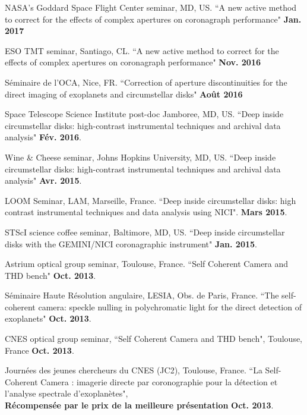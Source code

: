 \documentclass[11pt,a4paper, french]{article}
\begin{document}
\begin{etaremune}
\item NASA's Goddard Space Flight Center seminar, MD, US. ``A new active method to correct for the effects of complex apertures on coronagraph performance" \textbf{Jan. 2017}

\item ESO TMT seminar, Santiago, CL. ``A new active method to correct for the effects of complex apertures on coronagraph performance" \textbf{Nov. 2016}

\item Séminaire de l'OCA, Nice, FR. ``Correction of aperture discontinuities for the direct imaging of exoplanets and circumstellar disks" \textbf{Août 2016}

\item Space Telescope Science Institute post-doc Jamboree, MD, US. ``Deep inside circumstellar disks: high-contrast instrumental techniques and archival data analysis" \textbf{Fév. 2016}.

\item Wine \& Cheese seminar, Johns Hopkins University, MD, US. ``Deep inside circumstellar disks: high-contrast instrumental techniques and archival data analysis" \textbf{Avr. 2015}.

\item LOOM Seminar, LAM, Marseille, France. ``Deep inside circumstellar disks: high contrast instrumental techniques and data analysis using NICI". \textbf{Mars 2015}.

\item STScI science coffee seminar, Baltimore, MD, US. ``Deep inside circumstellar disks with the GEMINI/NICI coronagraphic instrument"  \textbf{Jan. 2015}.

\item Astrium optical group seminar, Toulouse, France. ``Self Coherent Camera and THD bench"  \textbf{Oct. 2013}.

\item Séminaire Haute Résolution angulaire, LESIA, Obs. de Paris, France. ``The self-coherent camera: speckle nulling in polychromatic light for the direct detection of exoplanets" \textbf{Oct. 2013}.

\item CNES optical group seminar, ``Self Coherent Camera and THD bench", Toulouse, France \textbf{Oct. 2013}.

\item Journées des jeunes chercheurs du CNES (JC2), Toulouse, France. ``La Self-Coherent Camera : imagerie directe par coronographie pour la détection et l'analyse spectrale d'exoplanètes",  \\
\textbf{Récompensée par le prix de la meilleure présentation} \textbf{Oct. 2013}.


\end{etaremune}
\end{document}
